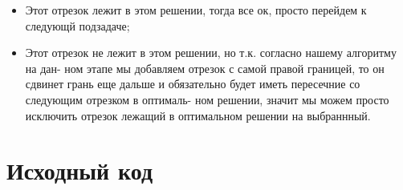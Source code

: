 \begin{itemize}
	\item Этот отрезок лежит в этом решении, тогда все ок, просто перейдем к следующй
	подзадаче;
	\item Этот отрезок не лежит в этом решении, но т.к. согласно нашему алгоритму на дан-
	ном этапе мы добавляем отрезок с самой правой границей, то он сдвинет грань еще
	дальше и обязательно будет иметь пересечние со следующим отрезком в оптималь-
	ном решении, значит мы можем просто исключить отрезок лежащий в оптимальном решении на выбраннный.
\end{itemize}

\section{Исходный код}

\vspace{\baselineskip}

